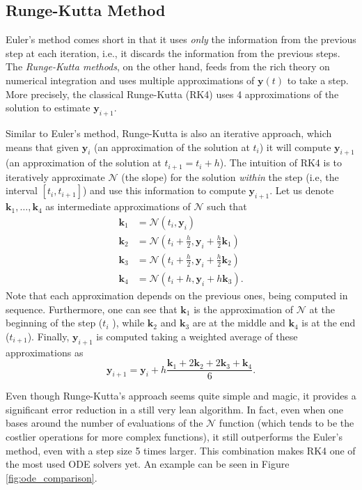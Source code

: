 \subsection{Runge-Kutta Method}

Euler's method comes short in that it uses \emph{only} the information from the previous step at each iteration, i.e., it discards the information from the previous steps.
The \emph{Runge-Kutta methods}, on the other hand, feeds from the rich theory on numerical integration and uses multiple approximations of $\bm{y}\left( t \right)$ to take a step.
More precisely, the classical Runge-Kutta (RK4) uses 4 approximations of the solution to estimate $\bm{y}_{i+1}$.

Similar to Euler's method, Runge-Kutta is also an iterative approach, which means that given $\bm{y}_i$ (an approximation of the solution at $t_i$) it will compute $\bm{y}_{i+1}$ (an approximation of the solution at $t_{i+1}=t_i + h$).
The intuition of RK4 is to iteratively approximate $\mathcal{N}$ (the slope) for the solution \emph{within} the step (i.e, the interval $\left[ t_i,t_{i+1} \right] $) and use this information to compute $\bm{y}_{i+1}$.
Let us denote $\bm{k}_1,\ldots,\bm{k}_4$ as intermediate approximations of $\mathcal{N}$ such that
\begin{align*}
    \bm{k}_1 &= \mathcal{N}\left( t_i , \bm{y}_i \right)  \\
    \bm{k}_2 &= \mathcal{N}\left( t_i+\frac{h}{2}, \bm{y}_i + \frac{h}{2}\bm{k}_1 \right)  \\
    \bm{k}_3 &= \mathcal{N}\left( t_i+\frac{h}{2}, \bm{y}_i + \frac{h}{2}\bm{k}_2 \right)  \\
    \bm{k}_4 &= \mathcal{N}\left( t_i+h, \bm{y}_i + h \bm{k}_3 \right)
.\end{align*}
Note that each approximation depends on the previous ones, being computed in sequence.
Furthermore, one can see that $\bm{k}_1$ is the approximation of $\mathcal{N}$ at the beginning of the step ($t_i$ ), while $\bm{k}_2$ and $\bm{k}_3$ are at the middle and $\bm{k}_4$ is at the end ($t_{i+1}$).
Finally, $\bm{y}_{i+1}$ is computed taking a weighted average of these approximations as \[
    \bm{y}_{i+1} = \bm{y}_i + h \frac{\bm{k}_1 + 2\bm{k}_2 + 2 \bm{k}_3 + \bm{k}_4}{6}
.\]

Even though Runge-Kutta's approach seems quite simple and magic, it provides a significant error reduction in a still very lean algorithm.
In fact, even when one bases around the number of evaluations of the $\mathcal{N}$ function (which tends to be the costlier operations for more complex functions), it still outperforms the Euler's method, even with a step size 5 times larger\footnotemark.
This combination makes RK4 one of the most used ODE solvers yet.
An example can be seen in Figure \ref{fig:ode_comparison}.

